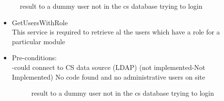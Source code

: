 \begin {itemize}
\begin{figure}[h!]
  \centering
  \caption{result to a dummy user not in the cs database trying to login }
\end{figure}

 
\begin {itemize}
\item {GetUsersWithRole}\\
This service is required to retrieve al the users which have a role for a particular module
\\

\item Pre-conditions:\\
-could connect to CS data source (LDAP) (not implemented-Not Implemented) No code found and no administrative users on site\\
 \begin{figure}[h!]
  \centering
  \caption{result to a dummy user not in the cs database trying to login }
\end{figure}   


 \end {itemize}  
\end {itemize}